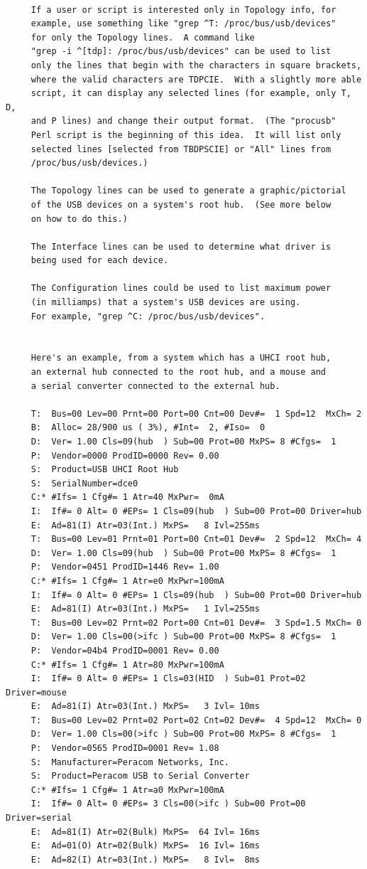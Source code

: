 \begin{verbatim}
     
     If a user or script is interested only in Topology info, for
     example, use something like "grep ^T: /proc/bus/usb/devices"
     for only the Topology lines.  A command like
     "grep -i ^[tdp]: /proc/bus/usb/devices" can be used to list
     only the lines that begin with the characters in square brackets,
     where the valid characters are TDPCIE.  With a slightly more able
     script, it can display any selected lines (for example, only T, D,
     and P lines) and change their output format.  (The "procusb"
     Perl script is the beginning of this idea.  It will list only
     selected lines [selected from TBDPSCIE] or "All" lines from
     /proc/bus/usb/devices.)
     
     The Topology lines can be used to generate a graphic/pictorial
     of the USB devices on a system's root hub.  (See more below
     on how to do this.)
     
     The Interface lines can be used to determine what driver is
     being used for each device.
     
     The Configuration lines could be used to list maximum power
     (in milliamps) that a system's USB devices are using.
     For example, "grep ^C: /proc/bus/usb/devices".
     
     
     Here's an example, from a system which has a UHCI root hub,
     an external hub connected to the root hub, and a mouse and
     a serial converter connected to the external hub.
     
     T:  Bus=00 Lev=00 Prnt=00 Port=00 Cnt=00 Dev#=  1 Spd=12  MxCh= 2
     B:  Alloc= 28/900 us ( 3%), #Int=  2, #Iso=  0
     D:  Ver= 1.00 Cls=09(hub  ) Sub=00 Prot=00 MxPS= 8 #Cfgs=  1
     P:  Vendor=0000 ProdID=0000 Rev= 0.00
     S:  Product=USB UHCI Root Hub
     S:  SerialNumber=dce0
     C:* #Ifs= 1 Cfg#= 1 Atr=40 MxPwr=  0mA
     I:  If#= 0 Alt= 0 #EPs= 1 Cls=09(hub  ) Sub=00 Prot=00 Driver=hub
     E:  Ad=81(I) Atr=03(Int.) MxPS=   8 Ivl=255ms
     T:  Bus=00 Lev=01 Prnt=01 Port=00 Cnt=01 Dev#=  2 Spd=12  MxCh= 4
     D:  Ver= 1.00 Cls=09(hub  ) Sub=00 Prot=00 MxPS= 8 #Cfgs=  1
     P:  Vendor=0451 ProdID=1446 Rev= 1.00
     C:* #Ifs= 1 Cfg#= 1 Atr=e0 MxPwr=100mA
     I:  If#= 0 Alt= 0 #EPs= 1 Cls=09(hub  ) Sub=00 Prot=00 Driver=hub
     E:  Ad=81(I) Atr=03(Int.) MxPS=   1 Ivl=255ms
     T:  Bus=00 Lev=02 Prnt=02 Port=00 Cnt=01 Dev#=  3 Spd=1.5 MxCh= 0
     D:  Ver= 1.00 Cls=00(>ifc ) Sub=00 Prot=00 MxPS= 8 #Cfgs=  1
     P:  Vendor=04b4 ProdID=0001 Rev= 0.00
     C:* #Ifs= 1 Cfg#= 1 Atr=80 MxPwr=100mA
     I:  If#= 0 Alt= 0 #EPs= 1 Cls=03(HID  ) Sub=01 Prot=02 Driver=mouse
     E:  Ad=81(I) Atr=03(Int.) MxPS=   3 Ivl= 10ms
     T:  Bus=00 Lev=02 Prnt=02 Port=02 Cnt=02 Dev#=  4 Spd=12  MxCh= 0
     D:  Ver= 1.00 Cls=00(>ifc ) Sub=00 Prot=00 MxPS= 8 #Cfgs=  1
     P:  Vendor=0565 ProdID=0001 Rev= 1.08
     S:  Manufacturer=Peracom Networks, Inc.
     S:  Product=Peracom USB to Serial Converter
     C:* #Ifs= 1 Cfg#= 1 Atr=a0 MxPwr=100mA
     I:  If#= 0 Alt= 0 #EPs= 3 Cls=00(>ifc ) Sub=00 Prot=00 Driver=serial
     E:  Ad=81(I) Atr=02(Bulk) MxPS=  64 Ivl= 16ms
     E:  Ad=01(O) Atr=02(Bulk) MxPS=  16 Ivl= 16ms
     E:  Ad=82(I) Atr=03(Int.) MxPS=   8 Ivl=  8ms
     

\end{verbatim}

